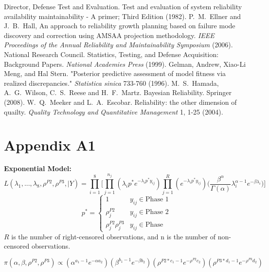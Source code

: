 \documentclass[12pt]{article}
\begin{document}
\begin{thebibliography}{99}
 Director, Defense Test and Evaluation. Test and evaluation of system reliability availability maintainability - A primer; Third Edition (1982).
 P.\ M.\ Ellner and J.\ B.\ Hall, An approach to reliability
growth planning based on failure mode discovery and correction using AMSAA
projection methodology. \textit{IEEE Proceedings of the Annual Reliability and
Maintainability Symposium} (2006).
 National Research Council. Statistics, Testing, and Defense
Acquisition: Background Papers. \textit{National Academies Press} (1999).
 Gelman, Andrew, Xiao-Li Meng, and Hal Stern. "Posterior
predictive assessment of model fitness via realized discrepancies."
\textit{Statistica sinica} 733-760 (1996).
 M.\ S.\ Hamada, A.\ G.\ Wilson, C.\ S.\ Reese and H.\ F.\ Martz.
Bayesian Reliability. Springer (2008).
 W.\ Q.\ Meeker and L.\ A.\ Escobar. Reliability: the other
dimension of quailty. \textit{Quality Technology and Quantitative Management} 1,
1-25 (2004).
\end{thebibliography}

\section{Appendix A1}
\textbf{Exponential Model:}
\begin{equation*}
L(\lambda_1, ..., \lambda_8, \rho^{P2}, \rho^{P3}, \vert Y) = \prod_{i = 1}^8
  \Bigg[\prod_{j = 1}^{n_j}(\lambda_i p^*e^{-\lambda_i p^* y_{ij}})\prod_{j =
  1}^R(e^{-\lambda_i p^*
  y_{ij}})\Big(\frac{\beta^\alpha}{\Gamma(\alpha)}\lambda_i^{\alpha -
  1}e^{-\beta\lambda_i}\Big)\Bigg]
\end{equation*}
\[p^* =   \left\{
\begin{array}{ll}
      1 & y_{ij}\in \text{Phase 1} \\
      \rho_{j}^{P2} & y_{ij} \in \text{Phase 2} \\
      \rho_{j}^{P2} \rho_{j}^{P3} & y_{ij} \in \text{Phase }
\end{array}
\right. \]
$R$ is the number of right-censored observations, and n is the number of
non-censored observations.

\begin{equation*}
\pi(\alpha, \beta, \rho^{P2}, \rho^{P3}) \propto (\alpha^{a_1-1}e^{-\alpha
  a_2})(\beta^{b_1 - 1}e^{-\beta b_2})(\rho^{P2*c_1 - 1}e^{-\rho^{P2}
  c_2})(\rho^{P3*d_1 - 1}e^{-\rho^{P3} d_2})
\end{equation*}
\end{document}
